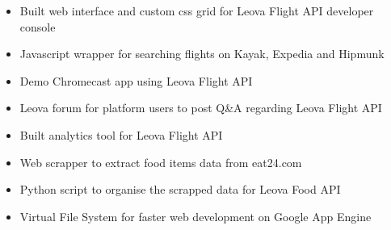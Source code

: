 \documentclass[10pt,a4paper]{altacv}
\begin{document}
\divider\smallskip

\begin{itemize}
\item Built web interface and custom css grid for Leova Flight API developer console
\item Javascript wrapper for searching flights on Kayak, Expedia and Hipmunk
\item Demo Chromecast app using Leova Flight API
\item Leova forum for platform users to post Q\&A regarding Leova Flight API
\item Built analytics tool for Leova Flight API
\item Web scrapper to extract food items data from eat24.com
\item Python script to organise the scrapped data for Leova Food API
\item Virtual File System for faster web development on Google App Engine
\end{itemize}

\divider\smallskip


\smallskip



\divider


\divider

\end{document}
